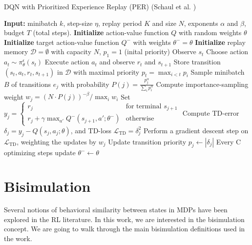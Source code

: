 \begin{algorithm}[h]
\caption{DQN with Prioritized Experience Replay (PER) (Schaul et al. \cite{schaul2015prioritized})}
\label{algorithm:dqn_per}
\begin{algorithmic}[1]
\State \textbf{Input:} minibatch $k$, step-size $\eta$, replay period $K$ and size $N$, exponents $\alpha$ and $\beta$, budget $T$ (total steps).
\State \textbf{Initialize} action-value function $Q$ with random weights $\theta$
\State \textbf{Initialize} target action-value function $Q^-$ with weights $\theta^- = \theta$
\State \textbf{Initialize} replay memory $\mathcal{D} = \emptyset$ with capacity $N$, $p_1 = 1$ (inital priority) %
    \State Observe $s_t$
    \State Choose action $a_t \sim \pi^\epsilon_\theta(s_t)$
    \State Execute action $a_t$ and observe $r_t$ and $s_{t+1}$
    \State Store transition $(s_t, a_t, r_t, s_{t+1})$ in $\mathcal{D}$ with maximal priority $p_t = \max_{i < t} p_i$
        \State Sample minibatch $B$ of transitions $e_j$ with probability $P(j) = \frac{p_j^\alpha}{\sum_i p_i^\alpha}$    
        \State Compute importance-sampling weight $w_j = \left( N \cdot P(j) \right)^{-\beta} / \max_i w_i$
        \State Set $y_j = 
        \begin{cases} 
            r_j & \text{for terminal } s_{j+1}\\
            r_j + \gamma \max_{a'} Q^-(s_{j+1}, a'; \theta^-) & \text{otherwise}
        \end{cases}$
        \State Compute TD-error $\delta_j = y_j - Q(s_{j}, a_{j}; \theta)$, and TD-loss $\mathcal{L}_{\text{TD}} = \delta_j^2 $
        \State Perform a gradient descent step on $\mathcal{L}_{\text{TD}}$, weighting the updates by $w_j$
        \State Update transition priority $p_j \leftarrow |\delta_j|$
        \State Every C optimizing steps update $\theta^- \leftarrow \theta$
    \EndIf
\EndFor
\end{algorithmic}
\end{algorithm}



\section{Bisimulation}
\label{sec:bisimulation_background}

Several notions of behavioral similarity between states in MDPs have been explored in the RL literature. In this work, we are interested in the bisimulation concept. We are going to walk through the main bisimulation definitions used in the work.


